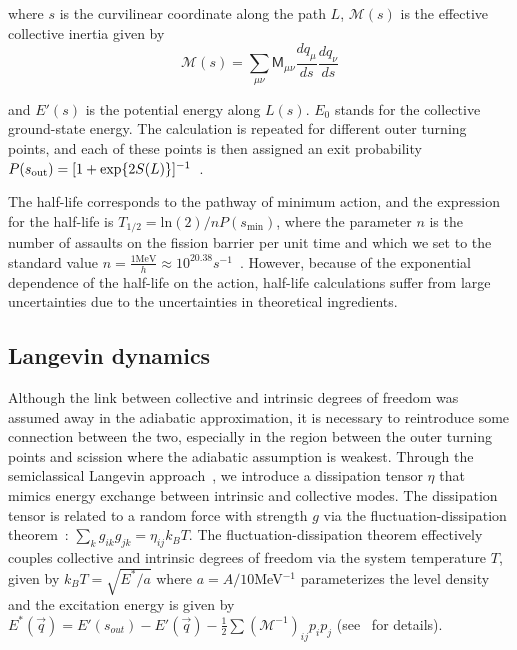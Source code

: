 \noindent where $s$ is the curvilinear coordinate along the path $L$, $\mathcal{M}(s)$ is the effective collective inertia given by~\cite{Sadhukhan2013}
\begin{equation}
\mathcal{M}(s) = \sum_{\mu\nu} \mathsf{M}_{\mu\nu} \frac{dq_\mu}{ds} \frac{dq_\nu}{ds}
\end{equation}

\noindent and $E'(s)$ is the potential energy along $L(s)$. $E_0$ stands for the collective ground-state energy. The calculation is repeated for different outer turning points, and each of these points is then assigned an exit probability $P(s_{\rm out})=[1+\exp{2S(L)}]^{-1}$~\cite{Baran1978}. 

The half-life corresponds to the pathway of minimum action, and the expression for the half-life is $T_{1/2} = \mathrm{ln}(2)/nP(s_\mathrm{min})$, where the parameter $n$ is the number of assaults on the fission barrier per unit time and which we set to the standard value $n=\frac{1 \mathrm{MeV}}{h}\approx10^{20.38} s^{-1}$~\cite{Baran1978}. However, because of the exponential dependence of the half-life on the action, half-life calculations suffer from large uncertainties due to the uncertainties in theoretical ingredients.

\subsection{Langevin dynamics}

Although the link between collective and intrinsic degrees of freedom was assumed away in the adiabatic approximation, it is necessary to reintroduce some connection between the two, especially in the region between the outer turning points and scission where the adiabatic assumption is weakest. Through the semiclassical Langevin approach~\cite{Kubo1966}, we introduce a dissipation tensor $\eta$ that mimics energy exchange between intrinsic and collective modes. The dissipation tensor is related to a random force with strength $g$ via the fluctuation-dissipation theorem~\cite{Callen1951,Kubo1966}: $\sum_k g_{ik}g_{jk} = \eta_{ij}k_BT$. The fluctuation-dissipation theorem effectively couples collective and intrinsic degrees of freedom via the system temperature $T$, given by $k_BT = \sqrt{E^*/a}$ where $a=A/10$MeV$^{-1}$ parameterizes the level density and the excitation energy is given by $E^*(\vec{q}) = E'(s_{out}) - E'(\vec{q}) - \frac{1}{2}\sum\left(\mathcal{M}^{-1}\right)_{ij}p_i p_j$ (see~\cite{Abe1996,Frobrich1998,Sadhukhan2016} for details).

